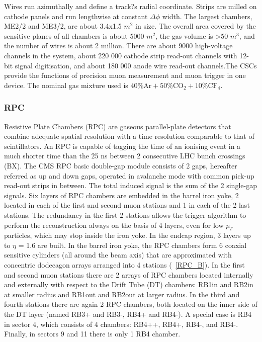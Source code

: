 Wires run azimuthally and define a track?s radial coordinate. Strips are milled on cathode panels and run lengthwise at constant $\Delta \phi$ width. The largest chambers, ME2/2 and ME3/2, are about 3.4x1.5 $m^{2}$ in size. The overall area covered by the sensitive planes of all chambers is about 5000 $m^{2}$, the gas volume is >50 $m^{3}$, and the number of wires is about 2 million. There are about 9000 high-voltage channels in the system, about 220 000 cathode strip read-out channels with 12-bit signal digitisation, and about 180 000 anode wire read-out channels.The CSCs provide the functions of precision muon measurement and muon trigger in one device. The nominal gas mixture used is 
$\mathrm{40\%Ar + 50\%CO_{2} + 10\%CF_{4}.}$

\subsubsection{RPC}
Resistive Plate Chambers (RPC) are gaseous parallel-plate detectors that combine adequate spatial resolution with a time resolution comparable to that of scintillators. An RPC is capable of tagging the time of an ionising event in a much shorter time than the 25 ns between 2 consecutive LHC bunch crossings (BX). The CMS RPC basic double-gap module consists of 2 gaps, hereafter referred as up and down gaps, operated in avalanche mode with common pick-up read-out strips in between. The total induced signal is the sum of the 2 single-gap signals.  Six layers of RPC chambers are embedded in the barrel iron yoke, 2 located in each of the first and second muon stations and 1 in each of the 2 last stations. The redundancy in the first 2 stations allows the trigger algorithm to perform the reconstruction always on the basis of 4 layers, even for low $p_{T}$ particles, which may stop inside the iron yoke. In the endcap region, 3 layers up to $\eta$ = 1.6 are built. In the barrel iron yoke, the RPC chambers form 6 coaxial sensitive cylinders (all around the beam axis) that are approximated with concentric dodecagon arrays arranged into 4 stations (\figurename~\ref{RPC_B}). In the first and second muon stations there are 2 arrays of RPC chambers located internally and externally with respect to the Drift Tube (DT) chambers: RB1in and RB2in at smaller radius and RB1out and RB2out at larger radius. In the third and fourth stations there are again 2 RPC chambers, both located on the inner side of the DT layer (named RB3+ and RB3-, RB4+ and RB4-). A special case is RB4 in sector 4, which consists of 4 chambers: RB4++, RB4+, RB4-, and RB4-. Finally, in sectors 9 and 11 there is only 1 RB4 chamber.
